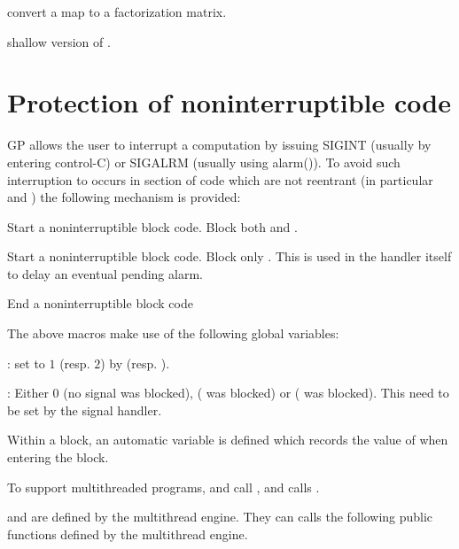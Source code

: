  convert a map to a factorization matrix.

 shallow version of .

\section{Protection of noninterruptible code}

GP allows the user to interrupt a computation by issuing SIGINT
(usually by entering control-C) or SIGALRM (usually using alarm()).
To avoid such interruption to occurs in section of code which are not
reentrant (in particular  and )
the following mechanism is provided:

  Start a noninterruptible block code. Block both  and .

  Start a noninterruptible block code. Block only .
This is used in the  handler itself to delay an eventual pending
alarm.

  End a noninterruptible block code

The above macros make use of the following global variables:

: set to $1$ (resp. $2$) by 
(resp. ).

: Either $0$ (no signal was blocked), 
( was blocked) or  ( was blocked).
This need to be set by the signal handler.

Within a block, an automatic variable  is defined which
records the value of  when entering the block.


To support multithreaded programs,  and
 call , and
 calls .

 and  are defined by the
multithread engine. They can calls the following public functions defined by
the multithread engine.




